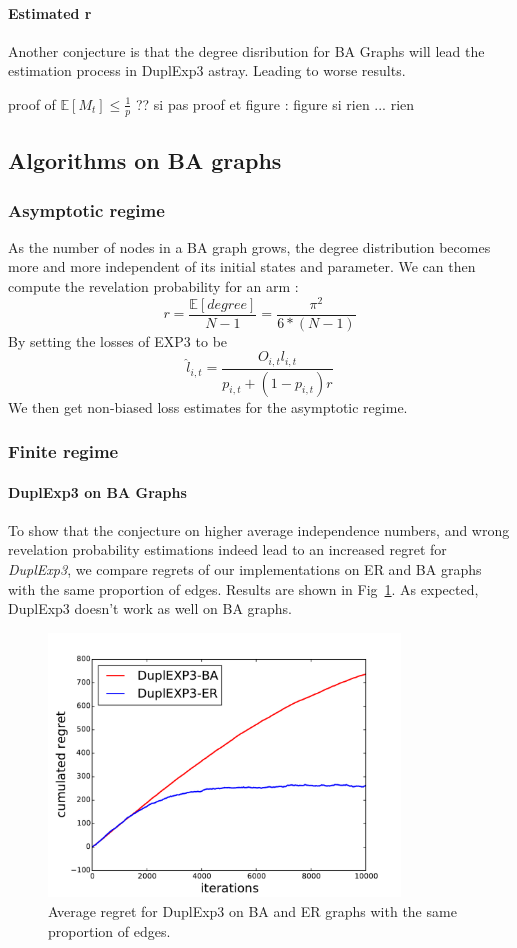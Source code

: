 \documentclass[10pt,a4paper]{scrartcl}
\providecommand{\E}{\mathbb{E}}
\begin{document}
\paragraph{Estimated r}
Another conjecture is that the degree disribution for BA Graphs will lead the estimation process in DuplExp3 astray. Leading to worse results.


proof of $\E[M_t] \leq \frac{1}{p}$ ??
si pas proof et figure : figure
si rien ... rien


\subsection{Algorithms on BA graphs}
\subsubsection{Asymptotic regime}
As the number of nodes in a BA graph grows, the degree distribution becomes more and more independent of its initial states and parameter. We can then compute the revelation probability for an arm :
$$r = \frac{\E[degree]}{N-1} = \frac{\pi^2}{6*(N-1)}$$
By setting the losses of EXP3 to be 
$$\hat{l}_{i,t} = \frac{O_{i,t}l_{i,t}}{p_{i,t}+(1-p_{i,t})r}$$
We then get non-biased loss estimates for the asymptotic regime.

\subsubsection{Finite regime}
\paragraph{DuplExp3 on BA Graphs}
To show that the conjecture on higher average independence numbers, and wrong revelation probability estimations indeed lead to an increased regret for \emph{DuplExp3}, we compare regrets of our implementations on ER and BA graphs with the same proportion of edges. Results are shown in Fig~\ref{dupl_er_ba}. As expected, DuplExp3 doesn't work as well on BA graphs.

\begin{figure}[h!]
\centering
 \includegraphics[height=7cm]{figures/50compare_dupl_er_ba.pdf}
 \caption{Average regret for DuplExp3 on BA and ER graphs with the same proportion of edges.}
 \label{dupl_er_ba}
\end{figure}
\end{document}
